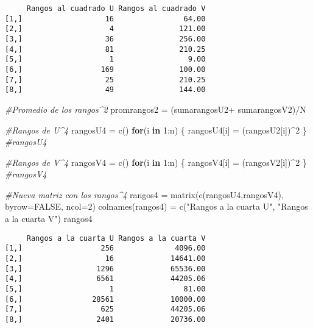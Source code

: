 \documentclass[
  a4paper,
  oneside,
  openany]{book}
\newenvironment{Shaded}{\begin{snugshade}}{\end{snugshade}}
\newcommand{\AttributeTok}[1]{\textcolor[rgb]{0.77,0.63,0.00}{#1}}
\newcommand{\CommentTok}[1]{\textcolor[rgb]{0.56,0.35,0.01}{\textit{#1}}}
\newcommand{\ConstantTok}[1]{\textcolor[rgb]{0.00,0.00,0.00}{#1}}
\newcommand{\ControlFlowTok}[1]{\textcolor[rgb]{0.13,0.29,0.53}{\textbf{#1}}}
\newcommand{\DecValTok}[1]{\textcolor[rgb]{0.00,0.00,0.81}{#1}}
\newcommand{\FunctionTok}[1]{\textcolor[rgb]{0.00,0.00,0.00}{#1}}
\newcommand{\NormalTok}[1]{#1}
\newcommand{\OtherTok}[1]{\textcolor[rgb]{0.56,0.35,0.01}{#1}}
\newcommand{\SpecialCharTok}[1]{\textcolor[rgb]{0.00,0.00,0.00}{#1}}
\newcommand{\StringTok}[1]{\textcolor[rgb]{0.31,0.60,0.02}{#1}}
\begin{document}
\begin{verbatim}
     Rangos al cuadrado U Rangos al cuadrado V
[1,]                   16                64.00
[2,]                    4               121.00
[3,]                   36               256.00
[4,]                   81               210.25
[5,]                    1                 9.00
[6,]                  169               100.00
[7,]                   25               210.25
[8,]                   49               144.00
\end{verbatim}

\begin{Shaded}
\begin{Highlighting}[]
\CommentTok{\#Promedio de los rangos\^{}2}
\NormalTok{promrangos2 }\OtherTok{=}\NormalTok{ (sumarangosU2}\SpecialCharTok{+}\NormalTok{ sumarangosV2)}\SpecialCharTok{/}\NormalTok{N}

\CommentTok{\#Rangos de U\^{}4}
\NormalTok{rangosU4 }\OtherTok{=} \FunctionTok{c}\NormalTok{()}
\ControlFlowTok{for}\NormalTok{(i }\ControlFlowTok{in} \DecValTok{1}\SpecialCharTok{:}\NormalTok{n) \{}
\NormalTok{  rangosU4[i] }\OtherTok{=}\NormalTok{ (rangosU2[i])}\SpecialCharTok{\^{}}\DecValTok{2}
\NormalTok{\}}
\CommentTok{\#rangosU4}

\CommentTok{\#Rangos de V\^{}4}
\NormalTok{rangosV4 }\OtherTok{=} \FunctionTok{c}\NormalTok{()}
\ControlFlowTok{for}\NormalTok{(i }\ControlFlowTok{in} \DecValTok{1}\SpecialCharTok{:}\NormalTok{n) \{}
\NormalTok{  rangosV4[i] }\OtherTok{=}\NormalTok{ (rangosV2[i])}\SpecialCharTok{\^{}}\DecValTok{2}
\NormalTok{\}}
\CommentTok{\#rangosV4}

\CommentTok{\#Nueva matriz con los rangos\^{}4}
\NormalTok{rangos4 }\OtherTok{=} \FunctionTok{matrix}\NormalTok{(}\FunctionTok{c}\NormalTok{(rangosU4,rangosV4), }\AttributeTok{byrow=}\ConstantTok{FALSE}\NormalTok{, }\AttributeTok{ncol=}\DecValTok{2}\NormalTok{)}
\FunctionTok{colnames}\NormalTok{(rangos4) }\OtherTok{=} \FunctionTok{c}\NormalTok{(}\StringTok{"Rangos a la cuarta U"}\NormalTok{, }\StringTok{"Rangos a la cuarta V"}\NormalTok{)}
\NormalTok{rangos4}
\end{Highlighting}
\end{Shaded}

\begin{verbatim}
     Rangos a la cuarta U Rangos a la cuarta V
[1,]                  256              4096.00
[2,]                   16             14641.00
[3,]                 1296             65536.00
[4,]                 6561             44205.06
[5,]                    1                81.00
[6,]                28561             10000.00
[7,]                  625             44205.06
[8,]                 2401             20736.00
\end{verbatim}
\end{document}
